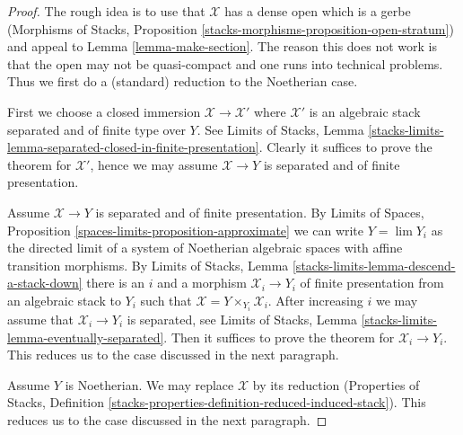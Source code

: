 \begin{proof}
The rough idea is to use that $\mathcal{X}$ has a dense open
which is a gerbe (Morphisms of Stacks, Proposition
\ref{stacks-morphisms-proposition-open-stratum})
and appeal to Lemma \ref{lemma-make-section}.
The reason this does not work is that the open may not be
quasi-compact and one runs into technical problems. Thus
we first do a (standard) reduction to the Noetherian case.

\medskip\noindent
First we choose a closed immersion
$\mathcal{X} \to \mathcal{X}'$ where $\mathcal{X}'$
is an algebraic stack separated and of finite type over $Y$.
See Limits of Stacks, Lemma
\ref{stacks-limits-lemma-separated-closed-in-finite-presentation}.
Clearly it suffices to prove the theorem for
$\mathcal{X}'$, hence we may assume $\mathcal{X} \to Y$
is separated and of finite presentation.

\medskip\noindent
Assume $\mathcal{X} \to Y$ is separated and of finite presentation.
By Limits of Spaces, Proposition \ref{spaces-limits-proposition-approximate}
we can write $Y = \lim Y_i$ as the directed limit of a system
of Noetherian algebraic spaces with affine transition morphisms.
By Limits of Stacks, Lemma \ref{stacks-limits-lemma-descend-a-stack-down}
there is an $i$ and a morphism $\mathcal{X}_i \to Y_i$ of finite presentation
from an algebraic stack to $Y_i$ such that
$\mathcal{X} = Y \times_{Y_i} \mathcal{X}_i$.
After increasing $i$ we may assume that $\mathcal{X}_i \to Y_i$
is separated, see Limits of Stacks, Lemma
\ref{stacks-limits-lemma-eventually-separated}.
Then it suffices to prove the theorem
for $\mathcal{X}_i \to Y_i$. This reduces us to the case discussed
in the next paragraph.

\medskip\noindent
Assume $Y$ is Noetherian. We may replace $\mathcal{X}$ by its
reduction (Properties of Stacks, Definition
\ref{stacks-properties-definition-reduced-induced-stack}).
This reduces us to the case discussed
in the next paragraph.


\end{proof}
